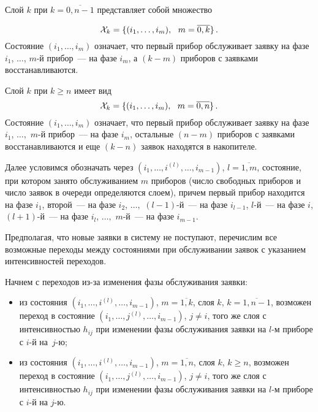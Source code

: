 \begin{multicols}{2}
Слой $k$ при $k=\overline{0,n-1}$ представляет собой множество

\noindent
\begin{equation*}
{\cal X}_k
=
\{(i_1,\ldots,i_m),\ \ m=\overline{0,k}\}\,.
\end{equation*}
Состояние $(i_1,\ldots,i_m)$ означает, что первый прибор обслуживает
заявку на фазе $i_1$, $\ldots$, $m$-й прибор~--- %
%
на фазе $i_m$, а
$(k-m)$ приборов с заявками восстанавливаются.

Слой $k$ при $k \ge n$ имеет вид
\begin{equation*}
{\cal X}_k
=
\{(i_1,\ldots,i_m),\ \ m=\overline{0,n}\}\,.
\end{equation*}
Состояние $(i_1,\ldots,i_m)$ означает, что первый прибор обслуживает
заявку на фазе $i_1$, $\ldots,$ $m$-й прибор~--- на фазе $i_m$, остальные
$(n-m)$ приборов с заявками восстанавливаются
и еще $(k-n)$ заявок находятся в накопителе.

Далее условимся обозначать через
$(i_1,\ldots,i^{(l)},\ldots,i_{m-1})$, $l=\overline{1,m}$,
состояние, при котором занято обслуживанием $m$ приборов (число
свободных приборов и число заявок в очереди определяются слоем),
причем
первый прибор находится на фазе $i_1$,
второй~--- на фазе $i_2$,
$\ldots,$
$(l-1)$-й~--- на фазе $i_{l-1}$,
$l$-й~--- на фазе $i$,
$(l+1)$-й~--- на фазе $i_{l}$,
$\ldots,$
$m$-й~--- на фазе $i_{m-1}$.

Предполагая, что новые заявки в систему не поступают, перечислим
все возможные переходы между состояниями при обслуживании
заявок с указанием интенсивностей переходов.

Начнем с переходов из-за изменения фазы обслуживания заявки:
\begin{itemize}
\item
из состояния
$(i_1,\ldots,i^{(l)},\ldots,i_{m-1})$,
$m=\overline{1,k}$,
слоя $k$, $k=\overline{1,n-1}$, возможен переход в состояние
$(i_1,\ldots,j^{(l)},\ldots,i_{m-1})$,
$j\ne i$,
того же слоя с интенсивностью $h_{ij}$ при изменении фазы
обслуживания заявки на $l$-м приборе с $i$-й на~$j$-ю;
\item
из состояния
$(i_1,\ldots,i^{(l)},\ldots,i_{m-1})$,
$m=\overline{1,n}$,
слоя $k$, $k\ge n$, возможен переход в состояние
$(i_1,\ldots,j^{(l)},\ldots,i_{m-1})$,
$j\ne i$,
того же слоя с интенсивностью $h_{ij}$ при изменении фазы
обслуживания заявки на $l$-м приборе с $i$-й на $j$-ю.
\end{itemize}


\end{multicols}
